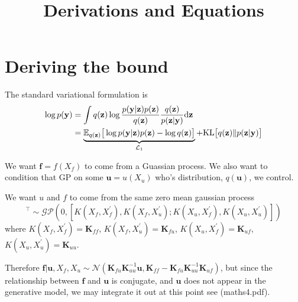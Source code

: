 \documentclass[12pt]{article}
\title{\textbf{Derivations and Equations}}
\date{}
\newcommand{\ub}{\mathbf{u}}
\newcommand{\zb}{\mathbf{z}}
\newcommand{\fb}{\mathbf{f}}
\newcommand{\yb}{\mathbf{y}}
\newcommand{\dd}{\mathrm{d}}
\newcommand{\Lo}{\mathcal{L}_1}
\newcommand{\Kff}{\mathbf{K}_{ff}}
\newcommand{\Kuu}{\mathbf{K}_{uu}}
\newcommand{\Kuf}{\mathbf{K}_{uf}}
\newcommand{\Kfu}{\mathbf{K}_{fu}}
\newcommand{\KL}{\mathrm{KL}}
\begin{document}
\maketitle


\section{Deriving the bound} %
\label{sec:derive_bound}
The standard variational formulation is
%
\begin{align}
    \log p(\yb) &= \int q(\zb)\log\frac{p(\yb|\zb)p(\zb)}{q(\zb)}\frac{q(\zb)}{p(\zb|\yb)} \dd\zb\notag\\
    &= \underbrace{\mathbb{E}_{q(\zb)}\big[ \log p(\yb|\zb)p(\zb) - \log q(\zb) \big]}_{\Lo} + \KL\big[ q(\zb)\Vert p(\zb|\yb) \big]\label{eq:logpy1}
\end{align}

We want $\fb = f(X_f)$ to come from a Guassian process. We also want to condition that GP on some $\ub=u(X_u)$ who's distribution, $q(\ub)$, we control.

We want $u$ and $f$ to come from the same zero mean gaussian process
%
\begin{equation}
    [f(X_f),u(X_u)]^\top \sim \mathcal{GP}(0,[K(X_f,X_f^\prime),K(X_f,X_u^\prime);K(X_u,X_f^\prime),K(X_u,X_u^\prime)])
\end{equation}
%
where $K(X_f,X_f^\prime) = \Kff$, $K(X_f,X_u^\prime) = \Kfu$, $ K(X_u,X_f^\prime) = \Kuf$, $K(X_u,X_u^\prime) = \Kuu$.

Therefore $\fb|\ub,X_f,X_u \sim \mathcal{N}(\Kfu\Kuu^{-1}\ub, \Kff - \Kfu\Kuu^{-1}\Kuf)$, but since the relationship between $\fb$ and $\ub$ is conjugate, and $\ub$ does not appear in the generative model, we may integrate it out at this point see (maths4.pdf).
%
\end{document}
